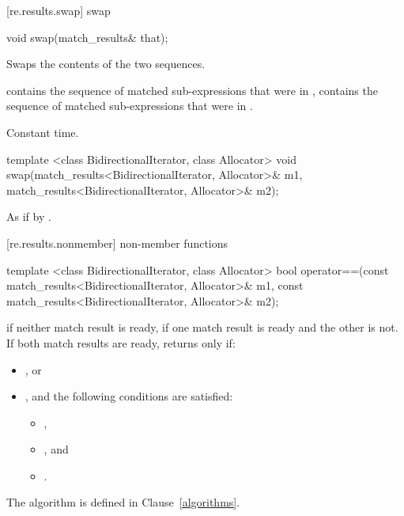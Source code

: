 [re.results.swap]{ swap}

%
\begin{itemdecl}
void swap(match_results& that);
\end{itemdecl}

\begin{itemdescr}
\pnum\effects  Swaps the contents of the two sequences.

\pnum\postconditions  {} contains the sequence of matched
sub-expressions that were in ,  contains the
sequence of matched sub-expressions that were in .

\pnum\complexity Constant time.
\end{itemdescr}

%
\begin{itemdecl}
template <class BidirectionalIterator, class Allocator>
  void swap(match_results<BidirectionalIterator, Allocator>& m1,
            match_results<BidirectionalIterator, Allocator>& m2);
\end{itemdecl}

\pnum\effects As if by .

[re.results.nonmember]{ non-member functions}

%
\begin{itemdecl}
template <class BidirectionalIterator, class Allocator>
bool operator==(const match_results<BidirectionalIterator, Allocator>& m1,
                const match_results<BidirectionalIterator, Allocator>& m2);
\end{itemdecl}

\begin{itemdescr}
\pnum
\returns
{} if neither match result is ready,  if one match result is ready and the
other is not. If both match results are ready, returns  only if:

\begin{itemize}
\item
{}, or

\item
{}, and the following conditions are satisfied:

\begin{itemize}
\item
{},

\item
{}, and

\item
{}.
\end{itemize}
\end{itemize}
\begin{note} The algorithm  is defined in Clause~\ref{algorithms}. \end{note}
\end{itemdescr}

